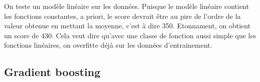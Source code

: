 On teste un modèle linéaire sur les données.
Puisque le modèle linéaire contient les fonctions constantes, a priori, le score devrait être au pire de l'ordre de la valeur obtenue en mettant la moyenne, c'est à dire 350.
Etonnament, on obtient un score de 430.
Cela veut dire qu'avec une classe de fonction aussi simple que les fonctions linéaires, on overfitte déjà sur les données d'entrainement.

\subsection{Gradient boosting}
